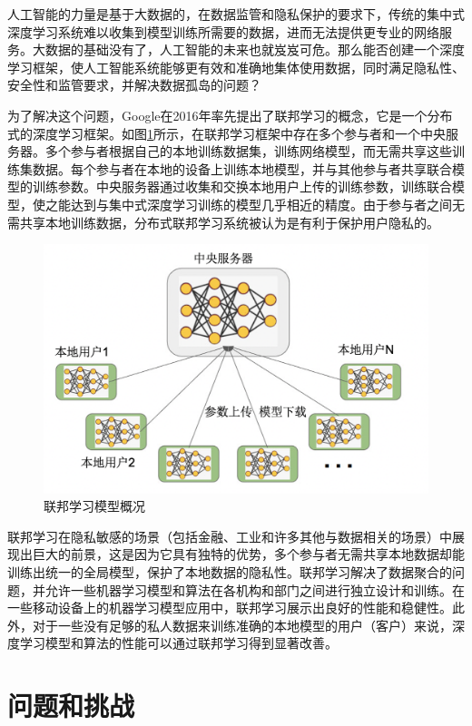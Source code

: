 人工智能的力量是基于大数据的，在数据监管和隐私保护的要求下，传统的集中式深度学习系统难以收集到模型训练所需要的数据，进而无法提供更专业的网络服务。大数据的基础没有了，人工智能的未来也就岌岌可危。那么能否创建一个深度学习框架，使人工智能系统能够更有效和准确地集体使用数据，同时满足隐私性、安全性和监管要求，并解决数据孤岛的问题？

为了解决这个问题，Google在2016年率先提出了联邦学习的概念，它是一个分布式的深度学习框架。如图\ref{fig:联邦学习模型概况}所示，在联邦学习框架中存在多个参与者和一个中央服务器。多个参与者根据自己的本地训练数据集，训练网络模型，而无需共享这些训练集数据。每个参与者在本地的设备上训练本地模型，并与其他参与者共享联合模型的训练参数。中央服务器通过收集和交换本地用户上传的训练参数，训练联合模型，使之能达到与集中式深度学习训练的模型几乎相近的精度。由于参与者之间无需共享本地训练数据，分布式联邦学习系统被认为是有利于保护用户隐私的。

\begin{figure}[!hbt]
\centering
	\includegraphics[scale=0.5]{fig2/C1/联邦学习}%
	\caption{联邦学习模型概况}
	\label{fig:联邦学习模型概况}	
\end{figure}

联邦学习在隐私敏感的场景（包括金融、工业和许多其他与数据相关的场景）中展现出巨大的前景，这是因为它具有独特的优势，多个参与者无需共享本地数据却能训练出统一的全局模型，保护了本地数据的隐私性。联邦学习解决了数据聚合的问题，并允许一些机器学习模型和算法在各机构和部门之间进行独立设计和训练。在一些移动设备上的机器学习模型应用中，联邦学习展示出良好的性能和稳健性。此外，对于一些没有足够的私人数据来训练准确的本地模型的用户（客户）来说，深度学习模型和算法的性能可以通过联邦学习得到显著改善。

\section {问题和挑战}
